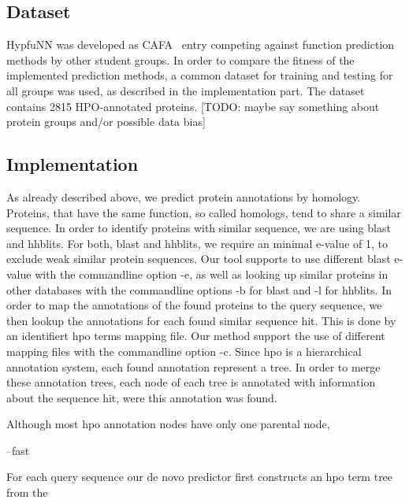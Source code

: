 \subsection{Dataset}

HypfuNN was developed as CAFA~\citep{CAFA} entry competing against function prediction methods by other student groups. In order to compare the fitness of the implemented prediction methods, a common dataset for training and testing for all groups was used, as described in the implementation part. The dataset contains 2815 HPO-annotated proteins. [TODO: maybe say something about protein groups and/or possible data bias]

\subsection{Implementation}

As already described above, we predict protein annotations by homology. Proteins, that have the same function, so called homologs, tend to share a similar sequence. In order to identify proteins
with similar sequence, we are using blast and hhblits. For both, blast and hhblits, we require an minimal e-value of 1, to exclude weak similar protein sequences. Our tool supports to use
different blast e-value with the commandline option -e, as well as looking up similar proteins in other databases with the commandline options -b for blast and -l for hhblits.\newline
In order to map the annotations of the found proteins to the query sequence, we then lookup the annotations for each found similar sequence hit. This is done by an identifiert hpo terms mapping file.
Our method support the use of different mapping files with the commandline option -c.\newline
Since hpo is a hierarchical annotation system, each found annotation represent a tree. In order to merge these annotation trees, each node of each tree is annotated with information about the sequence
hit, were this annotation was found.

Although most hpo annotation nodes have only one parental node, 





--fast 


For each query sequence our de novo predictor first constructs an hpo term tree from the 
